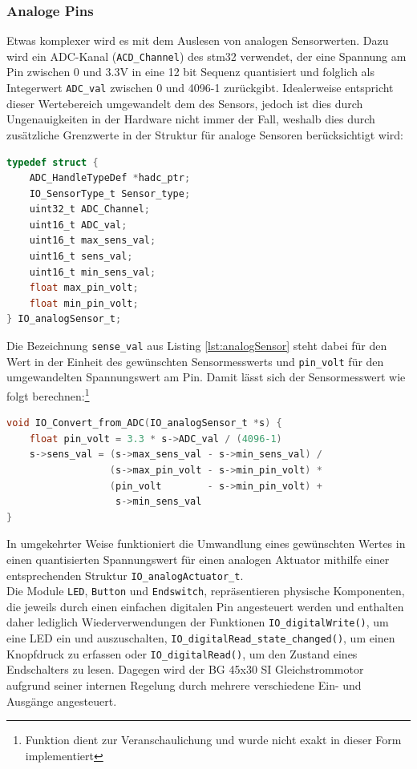 \subsubsection{Analoge Pins}
Etwas komplexer wird es mit dem Auslesen von analogen Sensorwerten. Dazu wird ein ADC-Kanal (\verb|ACD_Channel|) des stm32 verwendet, der eine Spannung am Pin zwischen 0 und 3.3V in eine 12 bit Sequenz quantisiert und folglich als Integerwert \verb|ADC_val| zwischen 0 und 4096-1 zurückgibt. Idealerweise entspricht dieser Wertebereich umgewandelt dem des Sensors, jedoch ist dies durch Ungenauigkeiten in der Hardware nicht immer der Fall, weshalb dies durch zusätzliche Grenzwerte in der Struktur für analoge Sensoren berücksichtigt wird:
\begin{lstlisting}[language=C, caption={Struktur für analoge Sensoren}, label={lst:analogSensor}]
typedef struct {
	ADC_HandleTypeDef *hadc_ptr;
	IO_SensorType_t Sensor_type;
	uint32_t ADC_Channel;
	uint16_t ADC_val;
	uint16_t max_sens_val;
	uint16_t sens_val;
	uint16_t min_sens_val;
	float max_pin_volt;
	float min_pin_volt;
} IO_analogSensor_t;
\end{lstlisting}
Die Bezeichnung \verb|sense_val| aus Listing \ref{lst:analogSensor} steht dabei für den Wert in der Einheit des gewünschten Sensormesswerts und \verb|pin_volt| für den umgewandelten Spannungswert am Pin. Damit lässt sich der Sensormesswert wie folgt berechnen:\footnote{Funktion dient zur Veranschaulichung und wurde nicht exakt in dieser Form implementiert}
\begin{lstlisting}[language=C, caption={Konvertierung des rohen Analogwerts}, label={analogRead}]
void IO_Convert_from_ADC(IO_analogSensor_t *s) {
	float pin_volt = 3.3 * s->ADC_val / (4096-1)
	s->sens_val = (s->max_sens_val - s->min_sens_val) /
	              (s->max_pin_volt - s->min_pin_volt) *
	              (pin_volt        - s->min_pin_volt) +
	               s->min_sens_val
}
\end{lstlisting}
In umgekehrter Weise funktioniert die Umwandlung eines gewünschten Wertes in einen quantisierten Spannungswert für einen analogen Aktuator mithilfe einer entsprechenden Struktur \verb|IO_analogActuator_t|. \\
Die Module \verb|LED|, \verb|Button| und \verb|Endswitch|, repräsentieren physische Komponenten, die jeweils durch einen einfachen digitalen Pin angesteuert werden und enthalten daher lediglich Wiederverwendungen der Funktionen \verb|IO_digitalWrite()|, um eine LED ein und auszuschalten, \verb|IO_digitalRead_state_changed()|, um einen Knopfdruck zu erfassen oder \verb|IO_digitalRead()|, um den Zustand eines Endschalters zu lesen. Dagegen wird der BG 45x30 SI Gleichstrommotor aufgrund seiner internen Regelung durch mehrere verschiedene Ein- und Ausgänge angesteuert.
